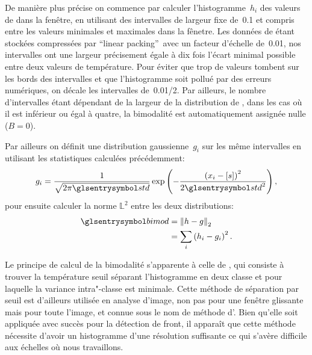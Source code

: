 De manière plus précise on commence par calculer l'histogramme~\(h_i\) des valeurs de  dans la fenêtre, en utilisant des intervalles de largeur fixe de~\qty{0.1}{\dC} et compris entre les valeurs minimales et maximales dans la fênetre.
Les données de  étant stockées compressées par \enquote{linear packing}\footnotemark\ avec un facteur d'échelle de~\qty{0.01}{\dC}, nos intervalles ont une largeur précisement égale à dix fois l'écart minimal possible entre deux valeurs de température.
Pour éviter que trop de valeurs tombent sur les bords des intervalles et que l'histogramme soit pollué par des erreurs numériques, on décale les intervalles de~\qty[parse-numbers=false]{0.01/2}{\dC}.
Par ailleurs, le nombre d'intervalles étant dépendant de la largeur de la distribution de , dans les cas où il est inférieur ou égal à quatre, la bimodalité est automatiquement assignée nulle (\(B=0\)).

Par ailleurs on définit une distribution gaussienne~\(g_i\) sur les même intervalles en utilisant les statistiques calculées précédemment:
\begin{equation}
  g_i = \frac{1}{\sqrt{2\pi\am{std}}} \exp\paren{-\frac{\paren{x_i-\moy{s}}^2}{2\am{std}^2}},
\end{equation}
pour ensuite calculer la norme \(\mathbb{L}^2\) entre les deux distributions:
\begin{equation}
  \begin{split}
  \am{bimod} & = \norme[2]{h - g}\\
             & = \sum_i \paren{h_i - g_i}^2 .
  \end{split}
\end{equation}

Le principe de calcul de la bimodalité s'apparente à celle de \textcite{cayula_1992}, qui consiste à trouver la température seuil séparant l'histogramme en deux classe et pour laquelle la variance intra"-classe est minimale.
Cette méthode de séparation par seuil est d'ailleurs utilisée en analyse d'image, non pas pour une fenêtre glissante mais pour toute l'image, et connue sous le nom de méthode d'\textcite{otsu_1979}.
Bien qu'elle soit appliquée avec succès pour la détection de front, il apparaît que cette méthode nécessite d'avoir un histogramme d'une résolution suffisante ce qui s'avère difficile aux échelles où nous travaillons.

